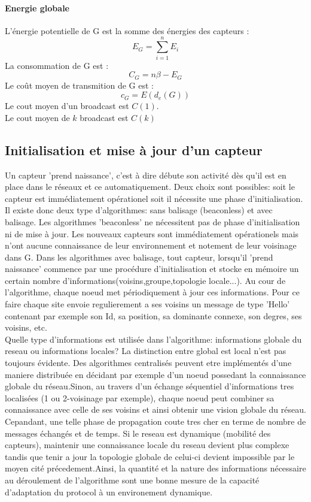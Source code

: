 \paragraph{Energie globale}
\begin{mydef}
 L'énergie potentielle de G est la somme des énergies des capteurs :$$E_G=\sum_{i=1}^n{E_i}$$
 La consommation de  G est :$$C_G=n\beta - E_G$$
 Le coût moyen de transmition de  G est :$$c_G=E(d_e(G))$$
 Le cout moyen d'un broadcast est $C(1)$.\\
 Le cout moyen de $k$ broadcast est $C(k)$


\end{mydef}

\subsection{Initialisation et mise à jour d'un capteur}
Un capteur 'prend naissance', c'est à dire débute son activité dès qu'il est en place dans le réseaux et ce automatiquement. Deux choix sont possibles: soit le capteur est immédiatement opérationel soit il nécessite une phase 
d'initialisation. Il existe donc deux type d'algorithmes: sans balisage (beaconless) et avec balisage. Les algorithmes 'beaconless' ne nécessitent pas de phase d'initialisation ni de mise à jour. Les nouveaux capteurs sont immédiatement 
opérationels mais n'ont aucune connaissance de leur environnement et notement de leur voisinage dans G. Dans les algorithmes avec balisage, tout capteur, lorsqu'il 'prend naissance' commence par une procédure d'initialisation et stocke en 
mémoire un certain nombre d'informations(voisins,groupe,topologie locale...). Au cour de l'algorithme, chaque noeud met périodiquement à jour ces informations. Pour ce faire chaque site envoie regulierement a ses voisins un message de type
'Hello' contenant par exemple son Id, sa position, sa dominante connexe, son degres, ses voisins, etc.\\
 

Quelle type d'informations est utilisée dans l'algorithme: informations globale du reseau ou informations locales? La distinction entre global est local n'est pas toujours évidente. Des algorithmes centralisés peuvent etre implémentés
 d'une maniere distribuée en décidant par exemple d'un noeud possedant la connaissance globale du réseau.Sinon, au travers d'un échange séquentiel d'informations tres localisées (1 ou 2-voisinage par exemple), chaque noeud peut combiner sa 
connaissance avec celle de ses voisins et ainsi obtenir une vision globale du réseau. Cepandant, une telle phase de propagation coute tres cher en terme de nombre de messages échangés et de temps.
Si le reseau est dynamique (mobilité des capteurs), maintenir une connaissance locale du reseau devient plus complexe tandis que tenir a jour la topologie globale de celui-ci devient impossible par le moyen cité précedement.Ainsi, 
la quantité et la nature des informations nécessaire au déroulement de l'algorithme sont une bonne mesure de la capacité d'adaptation du protocol à un environement dynamique.   


